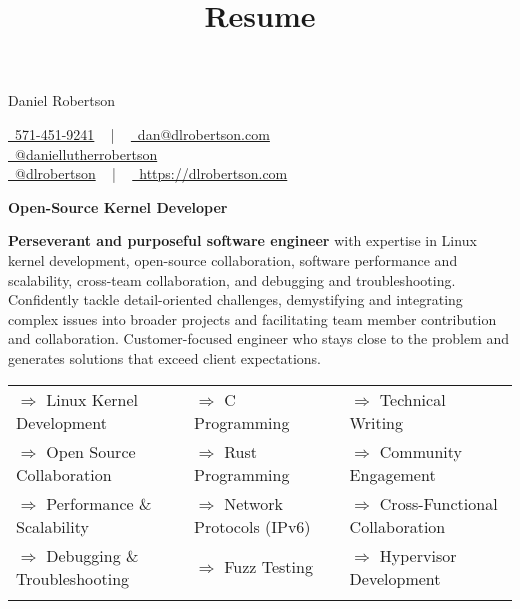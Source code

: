 \documentclass[a4paper,skipsamekey,11pt,english]{curve}
\title{Resume}
\newcommand{\allTheInfo}[3]{
  \begin{center}
    {\Huge\color{red} #1} \hfill {
      \begin{minipage}{3in}
        #2
      \end{minipage}
    }
    \vspace{10pt}
    \begin{tcolorbox}[
      sharp corners,
      boxrule=0mm,
      enhanced,
      borderline north={1pt}{0pt}{blue},
      borderline south={1pt}{0pt}{blue},
      borderline west={0pt}{0pt}{base1!10},
      borderline east={0pt}{0pt}{base1!10},
    ]
      \begin{center}
        \vspace{2pt}
        \Large{#3}
        \vspace{2pt}
      \end{center}
    \end{tcolorbox}
  \end{center}
}
\newcommand{\makeSkillRow}[3]{
  {$\Rightarrow$#1} & {$\Rightarrow$#2} & {$\Rightarrow$#3}\\
}
\begin{document}
  \allTheInfo{
    Daniel Robertson
  }{
    \href{tel:5714519241}{
      \raisebox{-0.05\height} \faPhone\ 571-451-9241} ~ | ~
    \href{mailto:dan@dlrobertson.com}{
      \raisebox{-0.15\height} \faEnvelope\ dan@dlrobertson.com}\\
    \href{www.linkedin.com/in/daniellutherrobertson/ }{
      \raisebox{-0.15\height} \faLinkedin\ @daniellutherrobertson }\\
    \href{https://github.com/dlrobertson}{
      \raisebox{-0.15\height} \faGithub\ @dlrobertson} ~ | ~
    \href{https://dlrobertson.com}{
      \raisebox{-0.15\height} \faGlobe\ https://dlrobertson.com}
  }{
    \color{base03}\textbf{Open-Source Kernel Developer}
  }

  \textbf{Perseverant and purposeful software engineer} with expertise in Linux kernel
  development, open-source collaboration, software performance and scalability,
  cross-team collaboration, and debugging and troubleshooting. Confidently
  tackle detail-oriented challenges, demystifying and integrating complex
  issues into broader projects and facilitating team member contribution and
  collaboration. Customer-focused engineer who stays close to the problem and
  generates solutions that exceed client expectations.
  \begin{center}
    \setlength{\tabcolsep}{1em}
    \begin{tabular}{ l l l }
      \makeSkillRow{
        Linux Kernel Development
      }{
        C Programming
      }{
        Technical Writing
      }
      \makeSkillRow{
        Open Source Collaboration
      }{
        Rust Programming
      }{
        Community Engagement
      }
      \makeSkillRow{
        Performance \& Scalability
      }{
        Network Protocols (IPv6)
      }{
        Cross-Functional Collaboration
      }
      \makeSkillRow{
        Debugging \& Troubleshooting
      }{
        Fuzz Testing
      }{
        Hypervisor Development
      }\\
    \end{tabular}
  \end{center}
\end{document}
